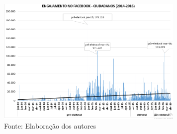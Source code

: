 \begin{figure}[!ht]
\centering
 \includegraphics[width=90mm]{./imgs/graf6_4.png}
\caption{Fonte: Elaboração dos autores}
\end{figure}

